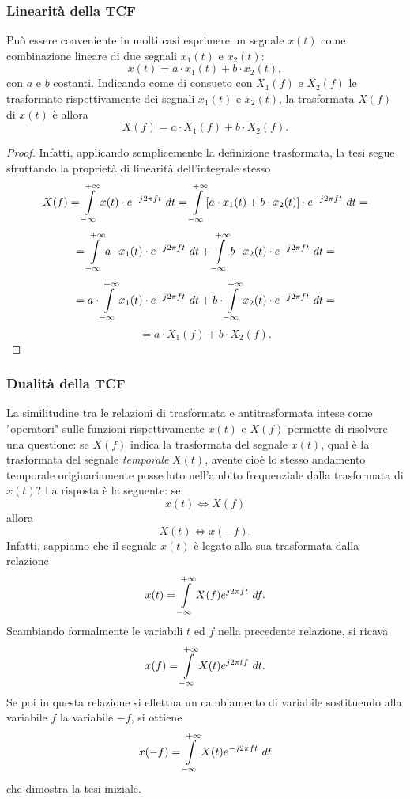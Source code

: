 \documentclass[12pt,oneside,openany]{memoir}
\numberwithin{equation}{subsection}
\newcommand{\dt}{\ dt}
\begin{document}
\subsubsection{Linearit\`a della TCF}
Pu\`o essere conveniente in molti casi esprimere un segnale $x(t)$ come
combinazione lineare di due segnali $x_1(t)$ e $x_2(t)$:
\[
	x(t) = a \cdot x_1(t) + b \cdot x_2(t),
\]
con $a$ e $b$ costanti. Indicando come di consueto con $X_1(f)$ e $X_2(f)$ le
trasformate rispettivamente dei segnali $x_1(t)$ e $x_2(t)$, la trasformata
$X(f)$ di $x(t)$ \`e allora
\[
	X(f) = a \cdot X_1(f) + b \cdot X_2(f).
\]
\begin{proof}
Infatti, applicando semplicemente la definizione trasformata, la tesi segue
sfruttando la propriet\`a di linearit\`a dell'integrale stesso
\[
	X(f) = \int\displaylimits_{-\infty}^{+\infty} x(t) \cdot e^{-j 2 \pi f t} \dt = \int\displaylimits_{-\infty}^{+\infty} [a \cdot x_1(t) + b \cdot x_2(t)] \cdot e^{-j 2 \pi f t} \dt =
\]
\[
	= \int\displaylimits_{-\infty}^{+\infty} a \cdot x_1(t) \cdot e^{-j 2 \pi f t} \dt + \int\displaylimits_{-\infty}^{+\infty} b \cdot x_2(t) \cdot e^{-j 2 \pi f t} \dt =
\]
\[
	= a \cdot \int\displaylimits_{-\infty}^{+\infty} x_1(t) \cdot e^{-j 2 \pi f t} \dt + b \cdot \int\displaylimits_{-\infty}^{+\infty} x_2(t) \cdot e^{-j 2 \pi f t} \dt =
\]
\[
	= a \cdot X_1(f) + b \cdot X_2(f).
\]
\end{proof}


\newpage
\subsubsection{Dualit\`a della TCF}
La similitudine tra le relazioni di trasformata e antitrasformata intese come
"operatori" sulle funzioni rispettivamente $x(t)$ e $X(f)$ permette di risolvere
una questione: se $X(f)$ indica la trasformata del segnale $x(t)$, qual \`e la
trasformata del segnale \textit{temporale} $X(t)$, avente cio\`e lo stesso
andamento temporale originariamente posseduto nell'ambito frequenziale dalla
trasformata di $x(t)$? La risposta \`e la seguente: se
\[
	x(t) \iff X(f)
\]
allora
\[
	X(t) \iff x(-f).
\]
Infatti, sappiamo che il segnale $x(t)$ \`e legato alla sua trasformata dalla
relazione
\[
	x(t) = \int\displaylimits_{-\infty}^{+\infty} X(f) e^{j 2 \pi f t} \ df.
\]
Scambiando formalmente le variabili $t$ ed $f$ nella precedente relazione, si
ricava
\[
	x(f) = \int\displaylimits_{-\infty}^{+\infty} X(t) e^{j 2 \pi t f} \ dt.
\]
Se poi in questa relazione si effettua un cambiamento di variabile sostituendo
alla variabile $f$ la variabile $-f$, si ottiene
\[
	x(-f) = \int\displaylimits_{-\infty}^{+\infty} X(t) e^{-j 2 \pi f t} \dt
\]
che dimostra la tesi iniziale.
\end{document}
